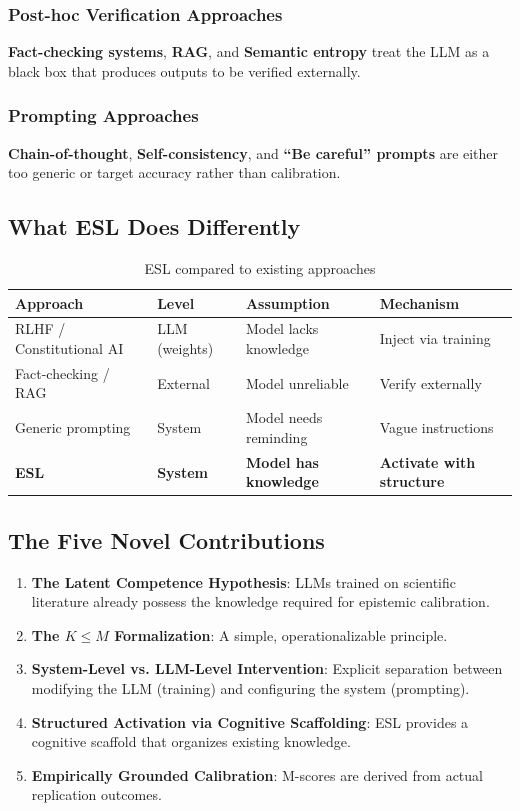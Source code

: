 \documentclass[11pt,a4paper]{article}
\begin{document}
\subsubsection{Post-hoc Verification Approaches}
\textbf{Fact-checking systems}, \textbf{RAG}, and \textbf{Semantic entropy} treat the LLM as a black box that produces outputs to be verified externally.

\subsubsection{Prompting Approaches}
\textbf{Chain-of-thought}, \textbf{Self-consistency}, and \textbf{``Be careful'' prompts} are either too generic or target accuracy rather than calibration.


\subsection{What ESL Does Differently}

\begin{table}[H]
\centering
\caption{ESL compared to existing approaches}
\begin{tabular}{llll}
\toprule
\textbf{Approach} & \textbf{Level} & \textbf{Assumption} & \textbf{Mechanism} \\
\midrule
RLHF / Constitutional AI & LLM (weights) & Model lacks knowledge & Inject via training \\
Fact-checking / RAG & External & Model unreliable & Verify externally \\
Generic prompting & System & Model needs reminding & Vague instructions \\
\textbf{ESL} & \textbf{System} & \textbf{Model has knowledge} & \textbf{Activate with structure} \\
\bottomrule
\end{tabular}
\end{table}


\subsection{The Five Novel Contributions}

\begin{enumerate}
    \item \textbf{The Latent Competence Hypothesis}: LLMs trained on scientific literature already possess the knowledge required for epistemic calibration.
    \item \textbf{The $K \leq M$ Formalization}: A simple, operationalizable principle.
    \item \textbf{System-Level vs. LLM-Level Intervention}: Explicit separation between modifying the LLM (training) and configuring the system (prompting).
    \item \textbf{Structured Activation via Cognitive Scaffolding}: ESL provides a cognitive scaffold that organizes existing knowledge.
    \item \textbf{Empirically Grounded Calibration}: M-scores are derived from actual replication outcomes.
\end{enumerate}
\end{document}
